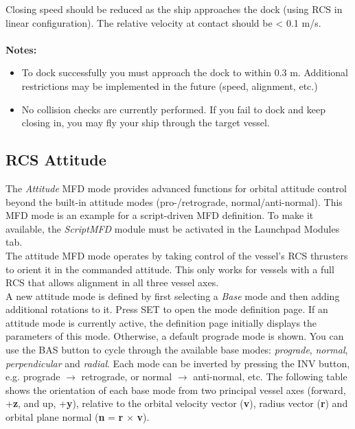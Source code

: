\documentclass[Orbiter User Manual.tex]{subfiles}
\begin{document}
\noindent
Closing speed should be reduced as the ship approaches the dock (using RCS in linear configuration). The relative velocity at contact should be < 0.1 m/s.\\
\\
\textbf{Notes:}

\begin{itemize}
\item To dock successfully you must approach the dock to within 0.3 m. Additional restrictions may be implemented in the future (speed, alignment, etc.)
\item No collision checks are currently performed. If you fail to dock and keep closing in, you may fly your ship through the target vessel.
\end{itemize}


\subsection{RCS Attitude}
The \textit{Attitude} MFD mode provides advanced functions for orbital attitude control beyond the built-in attitude modes (pro-/retrograde, normal/anti-normal). This MFD mode is an example for a script-driven MFD definition. To make it available, the \textit{ScriptMFD} module must be activated in the Launchpad Modules tab.\\
The attitude MFD mode operates by taking control of the vessel’s RCS thrusters to orient it in the commanded attitude. This only works for vessels with a full RCS that allows alignment in all three vessel axes.\\
A new attitude mode is defined by first selecting a \textit{Base} mode and then adding additional rotations to it. Press SET to open the mode definition page. If an attitude mode is currently active, the definition page initially displays the parameters of this mode. Otherwise, a default prograde mode is shown. You can use the BAS button to cycle through the available base modes: \textit{prograde}, \textit{normal}, \textit{perpendicular} and \textit{radial}. Each mode can be inverted by pressing the INV button, e.g. prograde $\rightarrow$ retrograde, or normal $\rightarrow$ anti-normal, etc. The following table shows the orientation of each base mode from two principal vessel axes (forward, +\textbf{z}, and up, +\textbf{y}), relative to the orbital velocity vector (\textbf{v}), radius vector (\textbf{r}) and orbital plane normal (\textbf{n} = \textbf{r} $\times$ \textbf{v}).
\end{document}
